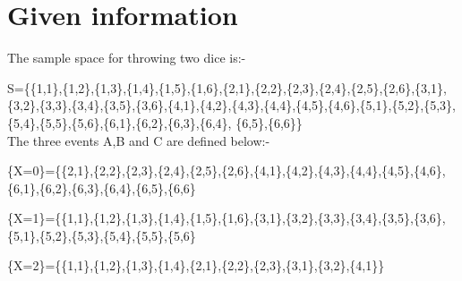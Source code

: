 \documentclass{beamer}
\begin{document}
\section{Given information} 
\begin{frame}{}
The sample space for throwing two dice is:-



S=\{\{1,1\},\{1,2\},\{1,3\},\{1,4\},\{1,5\},\{1,6\},\{2,1\},\{2,2\},\{2,3\},\{2,4\},\{2,5\},\{2,6\},\{3,1\},\{3,2\},\{3,3\},\{3,4\},\{3,5\},\{3,6\},\{4,1\},\{4,2\},\{4,3\},\{4,4\},\{4,5\},\{4,6\},\{5,1\},\{5,2\},\{5,3\},\{5,4\},\{5,5\},\{5,6\},\{6,1\},\{6,2\},\{6,3\},\{6,4\},
\{6,5\},\{6,6\}\}\\

The three events A,B and C are defined below:-\\
\item
\{X=0\}=\{\{2,1\},\{2,2\},\{2,3\},\{2,4\},\{2,5\},\{2,6\},\{4,1\},\{4,2\},\{4,3\},\{4,4\},\{4,5\},\{4,6\},\{6,1\},\{6,2\},\{6,3\},\{6,4\},\{6,5\},\{6,6\}\\
\item
\{X=1\}=\{\{1,1\},\{1,2\},\{1,3\},\{1,4\},\{1,5\},\{1,6\},\{3,1\},\{3,2\},\{3,3\},\{3,4\},\{3,5\},\{3,6\},\{5,1\},\{5,2\},\{5,3\},\{5,4\},\{5,5\},\{5,6\}\\
\item
\{X=2\}=\{\{1,1\},\{1,2\},\{1,3\},\{1,4\},\{2,1\},\{2,2\},\{2,3\},\{3,1\},\{3,2\},\{4,1\}\}\\

\end{frame}
\end{document}
